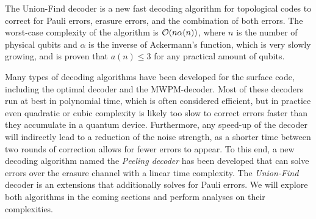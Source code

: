 The Union-Find decoder is a new fast decoding algorithm for topological codes to correct for Pauli errors, erasure errors, and the combination of both errors. The worst-case complexity of the algorithm is $\mathcal{O}(n\alpha(n))$, where $n$ is the number of physical qubits and $\alpha$ is the inverse of Ackermann's function, which is very slowly growing, and is proven that $a(n)\leq 3$ for any practical amount of qubits.

Many types of decoding algorithms have been developed for the surface code, including the optimal decoder and the MWPM-decoder. Most of these decoders run at best in polynomial time, which is often considered efficient, but in practice even quadratic or cubic complexity is likely too slow to correct errors faster than they accumulate in a quantum device. Furthermore, any speed-up of the decoder will indirectly lead to a reduction of the noise strength, as a shorter time between two rounds of correction allows for fewer errors to appear. To this end, a new decoding algorithm named the \emph{Peeling decoder} has been developed that can solve errors over the erasure channel with a linear time complexity. The \emph{Union-Find} decoder is an extensions that additionally solves for Pauli errors. We will explore both algorithms in the coming sections and perform analyses on their complexities.

